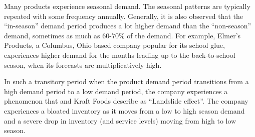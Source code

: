 \documentclass[,msom,nonblindrev]{informs}
\begin{document}








\maketitle


Many products experience seasonal demand. The seasonal patterns are
typically repeated with some frequency annually. Generally, it is also
observed that the ``in-season'' demand period produces a lot higher
demand than the ``non-season'' demand, sometimes as much as 60-70\% of
the demand. For example, Elmer's Products, a Columbus, Ohio based
company popular for its school glue, experiences higher demand for the
months leading up to the back-to-school season, when its forecasts are
multiplicatively high.

In such a transitory period when the product demand period transitions
from a high demand period to a low demand period, the company
experiences a phenomenon that \citet{neale2014} and Kraft Foods describe
as ``Landslide effect''. The company experiences a bloated inventory as
it moves from a low to high season demand and a severe drop in inventory
(and service levels) moving from high to low season.
\end{document}
